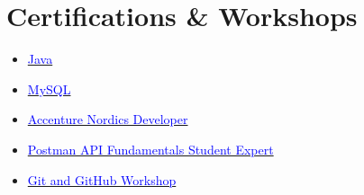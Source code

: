 \documentclass[letterpaper,11pt]{article}
\begin{document}
\section*{Certifications \& Workshops}
\begin{itemize}

   \item
   \href{https://drive.google.com/file/d/1LMBDrknzpRZ0OnbYsTMo8oOisqoqEKzi/view?usp=sharing}{\textcolor{blue}{Java}}


   \item
   \href{https://drive.google.com/file/d/1jF3zN1Ecp5yUa-SXFu_uIQ0HhCrE6xOG/view?usp=sharing}{\textcolor{blue}{MySQL}}

   \item
   \href{https://drive.google.com/file/d/1KzjUFKgFwRoj2dWXHj9HKbljyRhAMUpI/view?usp=sharing}{\textcolor{blue}{Accenture Nordics Developer}}

   \item
   \href{https://api.badgr.io/public/assertions/1fMtBEytRayXMeposAemSA}{\textcolor{blue}{Postman API Fundamentals Student Expert}}

   \item
   \href{https://drive.google.com/file/d/1X3HARMh4VaWnRau8UqEa5lfnjTw9ZLat/view}{\textcolor{blue}{Git and GitHub Workshop}}
  \end{itemize}
\end{document}
